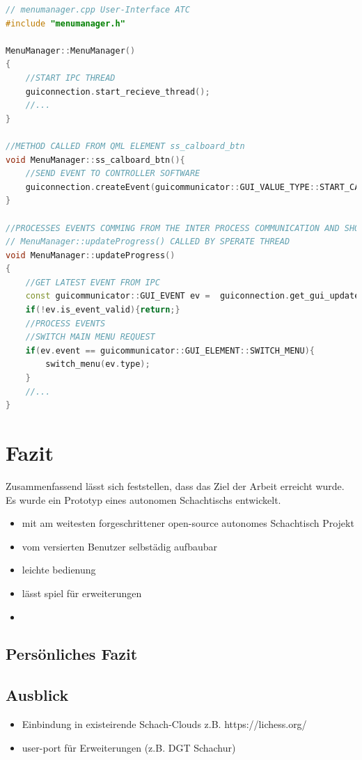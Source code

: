 \begin{lstlisting}[language={C++}]
// menumanager.cpp User-Interface ATC
#include "menumanager.h"

MenuManager::MenuManager()
{
    //START IPC THREAD
    guiconnection.start_recieve_thread();
    //...
}

//METHOD CALLED FROM QML ELEMENT ss_calboard_btn
void MenuManager::ss_calboard_btn(){
    //SEND EVENT TO CONTROLLER SOFTWARE
    guiconnection.createEvent(guicommunicator::GUI_VALUE_TYPE::START_CALBOARD_PROC);
}

//PROCESSES EVENTS COMMING FROM THE INTER PROCESS COMMUNICATION AND SHOWS MENUS OR SET IMAGES/LABES
// MenuManager::updateProgress() CALLED BY SPERATE THREAD
void MenuManager::updateProgress()
{
    //GET LATEST EVENT FROM IPC
    const guicommunicator::GUI_EVENT ev =  guiconnection.get_gui_update_event();
    if(!ev.is_event_valid){return;}
    //PROCESS EVENTS
    //SWITCH MAIN MENU REQUEST
    if(ev.event == guicommunicator::GUI_ELEMENT::SWITCH_MENU){
        switch_menu(ev.type);
    }
    //...
}
\end{lstlisting}

\hypertarget{fazit}{%
\chapter{Fazit}\label{fazit}}

Zusammenfassend lässt sich feststellen, dass das Ziel der Arbeit
erreicht wurde. Es wurde ein Prototyp eines autonomen Schachtischs
entwickelt.

\begin{itemize}
\item
  mit am weitesten forgeschrittener open-source autonomes Schachtisch
  Projekt
\item
  vom versierten Benutzer selbstädig aufbaubar
\item
  leichte bedienung
\item
  lässt spiel für erweiterungen
\item
\end{itemize}

\hypertarget{persuxf6nliches-fazit}{%
\section{Persönliches Fazit}\label{persuxf6nliches-fazit}}

\hypertarget{ausblick}{%
\section{Ausblick}\label{ausblick}}

\begin{itemize}
\tightlist
\item
  Einbindung in existeirende Schach-Clouds z.B. https://lichess.org/
\item
  user-port für Erweiterungen (z.B. DGT Schachur)
\end{itemize}
